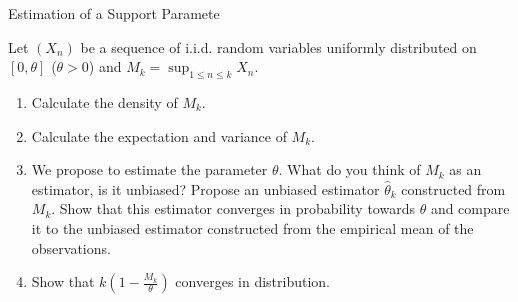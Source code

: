 \documentclass[../main.tex]{subfiles}
\begin{document}
\begin{exercise}{ Estimation of a Support Paramete}{}
    
Let $(X_n)$ be a sequence of i.i.d. random variables uniformly distributed on $[0,\theta]$ ($\theta > 0$) and $M_k = \sup_{1 \le n \le k} X_n$.
\begin{enumerate}
\item Calculate the density of $M_k$.
\item Calculate the expectation and variance of $M_k$.
\item We propose to estimate the parameter $\theta$. What do you think of $M_k$ as an estimator, is it unbiased? Propose an unbiased estimator $\hat{\theta}_k$ constructed from $M_k$. Show that this estimator converges in probability towards $\theta$ and compare it to the unbiased estimator constructed from the empirical mean of the observations.
\item Show that $k\left(1 - \frac{M_k}{\theta}\right)$ converges in distribution.
\end{enumerate}
\end{exercise}
\end{document}
